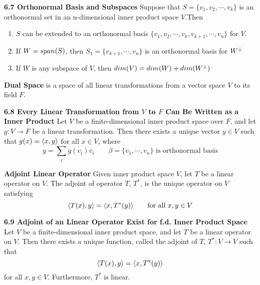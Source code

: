 \documentclass[11pt]{article}
\begin{document}
\begin{theorem*}
    \textbf{6.7 Orthonormal Basis and Subspaces} Suppose that $S = \{v_1,v_2,\cdots, v_k\}$ is an orthonormal set in an n-dimensional inner product space $V$.Then 
    \begin{enumerate}
        \item $S$ can be extended to an orthonormal basis $\{v_1,v_2,\cdots, v_k, v_{k+1}, \cdots, v_n\}$ for $V$. 
        \item If $W = span(S)$, then $S_1 = \{v_{k+1}, \cdots, v_n\}$ is an orthonormal basis for $W^{\perp}$ 
        \item If $W$ is any subspace of $V$, then $dim(V) = dim(W) + dim(W^{\perp})$
    \end{enumerate}
\end{theorem*}


\begin{defn*}
    \textbf{Dual Space} is a space of all linear transformations from a vector space $V$ to its field $F$. 
\end{defn*}

\begin{theorem*}
    \textbf{6.8 Every Linear Transformation from $V$ to $F$ Can Be Written as a Inner Product} Let $V$ be a finite-dimensional inner product space over $F$, and let $g: V\to F$ be a linear transformation. Then there exists a unique vector $y\in V$ such that $g(x) = \langle x,y\rangle$ for all $x\in V$, where
    \[
        y = \sum_i \overline{g(v_i)} v_i \qquad \text{$\beta = \{v_1,\cdots, v_n\}$ is orthonormal basis}
    \]
\end{theorem*}


\begin{defn*}
    \textbf{Adjoint Linear Operator} Given inner product space $V$, let $T$ be a linear operator on $V$. The adjoint of operator $T$, $T^*$, is the unique operator on $V$ satisfying 
    \[
        \langle T(x),y\rangle = \langle x,T^*(y)\rangle    
        \qquad \text{for all $x,y\in V$}
    \]
\end{defn*}

\begin{theorem*}
    \textbf{6.9 Adjoint of an Linear Operator Exist for f.d. Inner Product Space} Let $V$ be a finite-dimensional inner product space, and let $T$ be a linear operator on $V$. Then there exists a unique function, called the adjoint of $T$, $T^*: V\to V$ such that
    \[
        \langle T(x),y\rangle = \langle x,T^*(y)\rangle    
    \]
    for all $x,y\in V$. Furthermore, $T^*$ is linear. 
\end{theorem*}
\end{document}
